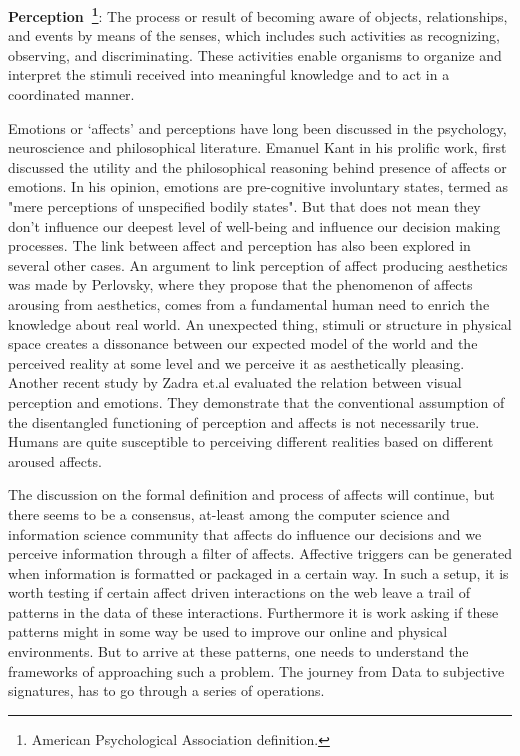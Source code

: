 \begin{definition}
    \textbf{Perception~\footnote{American Psychological Association definition.}}: The process or result of becoming aware of objects, relationships, and events by means of the senses, which includes such activities as recognizing, observing, and discriminating. These activities enable organisms to organize and interpret the stimuli received into meaningful knowledge and to act in a coordinated manner.
\end{definition}


Emotions or `affects' and perceptions have long been discussed in the psychology, neuroscience and philosophical literature. Emanuel Kant in his prolific work, first discussed the utility and the philosophical reasoning behind presence of affects or emotions\cite{kant1987critique}. In his opinion, emotions are pre-cognitive involuntary states, termed as "mere perceptions of unspecified bodily states"\cite{borges2004can}. But that does not mean they don't influence our deepest level of well-being and influence our decision making processes.
The link between affect and perception has also been explored in several other cases. An argument to link perception of affect producing aesthetics was made by Perlovsky\cite{perlovsky2014aesthetic}, where they propose that the phenomenon of affects arousing from aesthetics, comes from a fundamental human need to enrich the knowledge about real world. An unexpected thing, stimuli or structure in physical space creates a dissonance between our expected model of the world and the perceived reality at some level and we perceive it as aesthetically pleasing. Another recent study by Zadra et.al\cite{zadra2011emotion} evaluated the relation between visual perception and emotions. They demonstrate that the conventional assumption of the disentangled functioning of perception and affects is not necessarily true. Humans are quite susceptible to perceiving different realities based on different aroused affects. 

The discussion on the formal definition and process of affects will continue, but there seems to be a consensus, at-least among the computer science and information science community that affects do influence our decisions and we perceive information through a filter of affects. Affective triggers can be generated when information is formatted or packaged in a certain way. In such a setup, it is worth testing if certain affect driven interactions on the web leave a trail of patterns in the data of these interactions. Furthermore it is work asking if these patterns might in some way be used to improve our online and physical environments. But to arrive at these patterns, one needs to understand the frameworks of approaching such a problem. The journey from Data to subjective signatures, has to go through a series of operations. 

